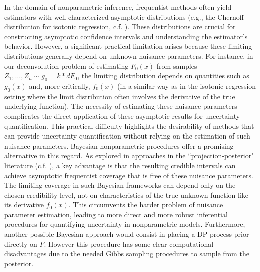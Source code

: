 In the domain of nonparametric inference, frequentist methods often yield estimators with well-characterized asymptotic distributions (e.g., the Chernoff distribution for isotonic regression, c.f. \cite{2}). These distributions are crucial for constructing asymptotic confidence intervals and understanding the estimator's behavior. However, a significant practical limitation arises because these limiting distributions generally depend on unknown nuisance parameters. For instance, in our deconvolution problem of estimating $F_0(x)$ from samples $Z_1, \dots, Z_n \sim g_0 = k * dF_0$, the limiting distribution depends on quantities such as $g_0(x)$ and, more critically, $f_0(x)$ (in a similar way as in the isotonic regression setting where the limit distribution often involves the derivative of the true underlying function). The necessity of estimating these nuisance parameters complicates the direct application of these asymptotic results for uncertainty quantification. This practical difficulty highlights the desirability of methods that can provide uncertainty quantification without relying on the estimation of such nuisance parameters. Bayesian nonparametric procedures offer a promising alternative in this regard. As explored in approaches in the ``projection-posterior" literature (c.f. \cite{54,55,56}), a key advantage is that the resulting credible intervals can achieve asymptotic frequentist coverage that is free of these nuisance parameters. The limiting coverage in such Bayesian frameworks can depend only on the chosen credibility level, not on characteristics of the true unknown function like its derivative $f_0(x)$. This circumvents the harder problem of nuisance parameter estimation, leading to more direct and more robust inferential procedures for quantifying uncertainty in nonparametric models. Furthermore, another possible Bayesian approach would consist in placing a DP process prior directly on $F$. However this procedure has some clear computational disadvantages due to the needed Gibbs sampling procedures to sample from the posterior.

